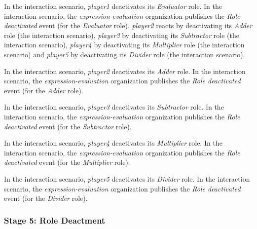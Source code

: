 In the {} interaction scenario, \textit{player1} deactivates its \textit{Evaluator} role.
In the {} interaction scenario, the \textit{expression-evaluation} organization publishes the \textit{Role deactivated} event (for the \textit{Evaluator} role).
\textit{player2} reacts by deactivating its \textit{Adder} role (the {} interaction scenario), \textit{player3} by deactivating its \textit{Subtractor} role (the {} interaction scenario), \textit{player4} by deactivating its \textit{Multiplier} role (the {} interaction scenario) and \textit{player5} by deactivating its \textit{Divider} role (the {} interaction scenario).

In the {} interaction scenario, \textit{player2} deactivates its \textit{Adder} role.
In the {} interaction scenario, the \textit{expression-evaluation} organization publishes the \textit{Role deactivated} event (for the \textit{Adder} role).

In the {} interaction scenario, \textit{player3} deactivates its \textit{Subtractor} role.
In the {} interaction scenario, the \textit{expression-evaluation} organization publishes the \textit{Role deactivated} event (for the \textit{Subtractor} role).

In the {} interaction scenario, \textit{player4} deactivates its \textit{Multiplier} role.
In the {} interaction scenario, the \textit{expression-evaluation} organization publishes the \textit{Role deactivated} event (for the \textit{Multiplier} role).

In the {} interaction scenario, \textit{player5} deactivates its \textit{Divider} role.
In the {} interaction scenario, the \textit{expression-evaluation} organization publishes the \textit{Role deactivated} event (for the \textit{Divider} role).

\subsubsection*{Stage 5: Role Deactment}

